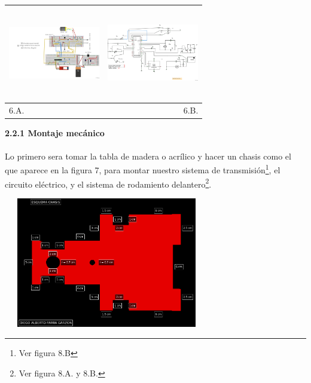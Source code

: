 \documentclass[12]{article}
\newenvironment{Figure}
{\par\medskip\noindent\minipage{\linewidth}}
{\endminipage\par\medskip}
\begin{document}
\begin{multicols}{2}
\begin{Figure}	
\center
\begin{tabular}{|l|r|}
\hline
\includegraphics[width=4cm, height=4cm]{img/montajep.png} & \includegraphics[width=4cm, height=4cm]{img/esquemap.png} \\ \hline
6.A. & 6.B. \\ \hline
\end{tabular}
\label{fig:g6}
\end{Figure}
\vspace{0.6 cm}

{\bf{2.2.1 Montaje mecánico}}\\\\
Lo primero sera tomar la tabla de madera o acrílico y hacer un chasis  como el que aparece en la figura 7, para montar nuestro sistema de transmisión\footnote{Ver figura 8.B}, el circuito eléctrico, y el sistema de rodamiento delantero\footnote{Ver figura 8.A. y 8.B.}.
\begin{Figure}	
\center
\includegraphics[width=9cm, height=5.7cm]{img/chasis.png} 
\label{fig:g7}
\end{Figure}
\vspace{0.6 cm}


\end{multicols}
\end{document}
